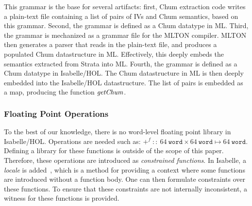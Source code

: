 This grammar is the base for several artifacts: first, Chum extraction code writes a plain-text file containing a list of pairs of IVs and Chum semantics, based on this grammar.
Second, the grammar is defined as a Chum datatype in ML.
Third, the grammar is mechanized as a grammar file for the MLTON compiler.
MLTON then generates a parser that reads in the plain-text file, and produces a populated Chum datastructure in ML.
Effectively, this deeply embeds the semantics extracted from Strata into ML.
Fourth, the grammar is defined as a Chum datatype in Isabelle/HOL.
The Chum datastructure in ML is then deeply embedded into the Isabelle/HOL datastructure.
The list of pairs is embedded as a map, producing the function $\mathit{getChum}$.

\subsubsection*{Floating Point Operations}\label{subssubec:fp}
To the best of our knowledge, there is no word-level floating point library in Isabelle/HOL.
Operations are needed such as: $+^f~::~64~\mathtt{word} \times 64~\mathtt{word} \mapsto 64~\mathtt{word}$.
Defining a library for these functions is outside of the scope of this paper.
Therefore, these operations are introduced as \emph{constrained functions}.
In Isabelle, a \emph{locale} is added~\cite{ballarin2003locales}, which is a method for providing a context where some functions are introduced without a function body.
One can then formulate constraints over these functions.
To ensure that these constraints are not internally inconsistent, a witness for these functions is provided.


